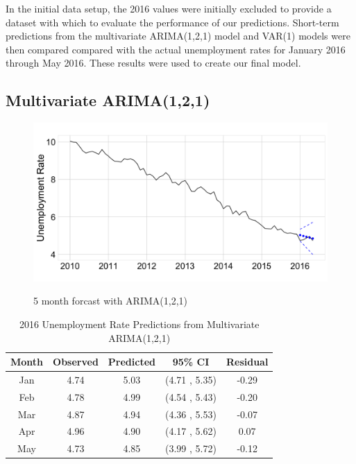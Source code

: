 \documentclass[twoside,twocolumn]{article}
\begin{document}
In the initial data setup, the 2016 values were initially excluded to provide a dataset with which to evaluate the performance of our predictions. Short-term predictions from the multivariate ARIMA(1,2,1) model and VAR(1) models were then compared compared with the actual unemployment rates for January 2016 through May 2016. These results were used to create our final model.

\subsection{Multivariate ARIMA(1,2,1)}

   \begin{figure}[htb]
    	\centering
     	\caption{5 month forcast with ARIMA(1,2,1)}
     	\includegraphics[width=\linewidth]{images/ARIMApred}
     	\label{fig:arimapred}
 \end{figure}

\begin{table}[ht]
\centering
\caption{2016 Unemployment Rate Predictions from Multivariate ARIMA(1,2,1)}
\label{tab:arimaforecast}
\begin{tabular}{ccccc}
  \hline
 Month & Observed & Predicted& 95\% CI  & Residual \\ 
  \hline
Jan & 4.74 & 5.03 & (4.71 , 5.35) & -0.29 \\ 
Feb & 4.78 & 4.99 & (4.54 , 5.43) & -0.20 \\ 
Mar & 4.87 & 4.94 & (4.36 , 5.53) & -0.07 \\ 
Apr & 4.96 & 4.90 & (4.17 , 5.62) & 0.07 \\ 
May & 4.73 & 4.85 & (3.99 , 5.72) & -0.12 \\ 
   \hline
\end{tabular}
\end{table}
\end{document}
